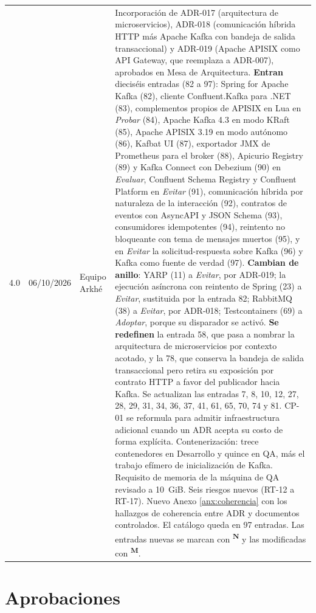 \documentclass[11pt,a4paper]{article}
\newcommand{\nueva}{\textsuperscript{\textcolor{vinotinto}{\scriptsize\bfseries N}}}
\newcommand{\modif}{\textsuperscript{\textcolor{ringProbar}{\scriptsize\bfseries M}}}
\begin{document}
\begin{longtable}{L{1.6cm} L{2.0cm} L{2.0cm} L{8.2cm}}
4.0 & 06/10/2026 & Equipo Arkhé & Incorporación de ADR-017 (arquitectura de microservicios), ADR-018 (comunicación híbrida HTTP más Apache Kafka con bandeja de salida transaccional) y ADR-019 (Apache APISIX como API Gateway, que reemplaza a ADR-007), aprobados en Mesa de Arquitectura. \textbf{Entran} dieciséis entradas (82 a 97): Spring for Apache Kafka (82), cliente Confluent.Kafka para .NET (83), complementos propios de APISIX en Lua en \emph{Probar} (84), Apache Kafka 4.3 en modo KRaft (85), Apache APISIX 3.19 en modo autónomo (86), Kafbat UI (87), exportador JMX de Prometheus para el broker (88), Apicurio Registry (89) y Kafka Connect con Debezium (90) en \emph{Evaluar}, Confluent Schema Registry y Confluent Platform en \emph{Evitar} (91), comunicación híbrida por naturaleza de la interacción (92), contratos de eventos con AsyncAPI y JSON Schema (93), consumidores idempotentes (94), reintento no bloqueante con tema de mensajes muertos (95), y en \emph{Evitar} la solicitud-respuesta sobre Kafka (96) y Kafka como fuente de verdad (97). \textbf{Cambian de anillo}: YARP (11) a \emph{Evitar}, por ADR-019; la ejecución asíncrona con reintento de Spring (23) a \emph{Evitar}, sustituida por la entrada 82; RabbitMQ (38) a \emph{Evitar}, por ADR-018; Testcontainers (69) a \emph{Adoptar}, porque su disparador se activó. \textbf{Se redefinen} la entrada 58, que pasa a nombrar la arquitectura de microservicios por contexto acotado, y la 78, que conserva la bandeja de salida transaccional pero retira su exposición por contrato HTTP a favor del publicador hacia Kafka. Se actualizan las entradas 7, 8, 10, 12, 27, 28, 29, 31, 34, 36, 37, 41, 61, 65, 70, 74 y 81. CP-01 se reformula para admitir infraestructura adicional cuando un ADR acepta su costo de forma explícita. Contenerización: trece contenedores en Desarrollo y quince en QA, más el trabajo efímero de inicialización de Kafka. Requisito de memoria de la máquina de QA revisado a 10~GiB. Seis riesgos nuevos (RT-12 a RT-17). Nuevo Anexo \ref{anx:coherencia} con los hallazgos de coherencia entre ADR y documentos controlados. El catálogo queda en 97 entradas. Las entradas nuevas se marcan con \nueva{} y las modificadas con \modif. \\
\end{longtable}

\section*{Aprobaciones}
\end{document}
